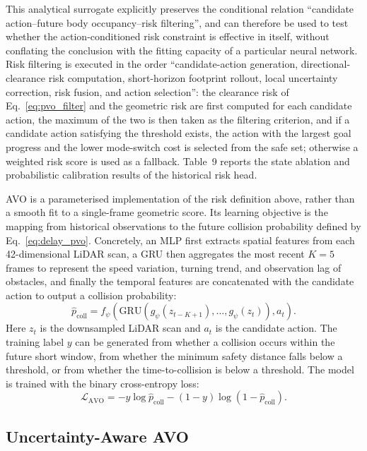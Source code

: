 \documentclass[10pt,a4paper,twocolumn]{article}
\begin{document}
This analytical surrogate explicitly preserves the conditional relation ``candidate action--future body occupancy--risk filtering'', and can therefore be used to test whether the action-conditioned risk constraint is effective in itself, without conflating the conclusion with the fitting capacity of a particular neural network. Risk filtering is executed in the order ``candidate-action generation, directional-clearance risk computation, short-horizon footprint rollout, local uncertainty correction, risk fusion, and action selection'': the clearance risk of Eq.~\ref{eq:pvo_filter} and the geometric risk are first computed for each candidate action, the maximum of the two is then taken as the filtering criterion, and if a candidate action satisfying the threshold exists, the action with the largest goal progress and the lower mode-switch cost is selected from the safe set; otherwise a weighted risk score is used as a fallback. Table~9 reports the state ablation and probabilistic calibration results of the historical risk head.

AVO is a parameterised implementation of the risk definition above, rather than a smooth fit to a single-frame geometric score. Its learning objective is the mapping from historical observations to the future collision probability defined by Eq.~\ref{eq:delay_pvo}. Concretely, an MLP first extracts spatial features from each 42-dimensional LiDAR scan, a GRU then aggregates the most recent $K=5$ frames to represent the speed variation, turning trend, and observation lag of obstacles, and finally the temporal features are concatenated with the candidate action to output a collision probability:
\begin{equation}
    \hat{p}_{\mathrm{coll}} =
    f_{\psi}\left(\mathrm{GRU}\left(g_{\psi}(z_{t-K+1}),\ldots,g_{\psi}(z_t)\right), a_t\right).
    \label{eq:pvo}
\end{equation}
Here $z_t$ is the downsampled LiDAR scan and $a_t$ is the candidate action. The training label $y$ can be generated from whether a collision occurs within the future short window, from whether the minimum safety distance falls below a threshold, or from whether the time-to-collision is below a threshold. The model is trained with the binary cross-entropy loss:
\begin{equation}
    \mathcal{L}_{\mathrm{AVO}} =
    -y \log \hat{p}_{\mathrm{coll}} - (1-y)\log(1-\hat{p}_{\mathrm{coll}}).
\end{equation}

\subsection{Uncertainty-Aware AVO}
\end{document}
